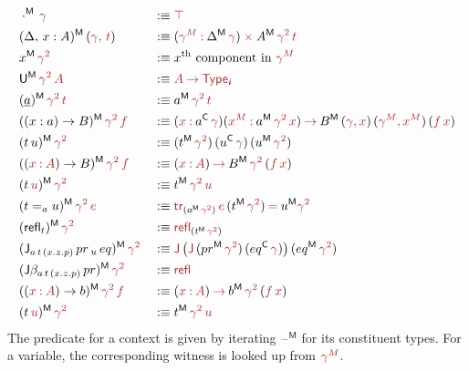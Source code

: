 \documentclass[a4paper,UKenglish]{lipics-v2018}
\newcommand{\U}{\mathsf{U}}
\newcommand{\ra}{\rightarrow}
\newcommand{\blank}{\mathord{\hspace{1pt}\text{--}\hspace{1pt}}} %
\newcommand{\C}{\mathsf{C}}
\newcommand{\M}{\mathsf{M}}
\newcommand{\refl}{\mathsf{refl}}
\newcommand{\1}{\mathsf{1}} \renewcommand{\Pr}{\mathsf{Pr}}
\renewcommand{\in}{\mathbin{\hat:}}
\renewcommand{\hat}[1]{{\color{BrickRed}{#1}}}
\newcommand{\rah}{\mathbin{\hat\ra}}
\newcommand{\commah}{\hat,\,}
\newcommand{\timesh}{\mathbin{\hat\times}}
\newcommand{\eqh}{\mathbin{\hat=}}
\newcommand{\TR}{\hat{\mathsf{tr}}}
\newcommand{\Type}{\hat{\mathsf{Type}}}
\begin{document}
\begin{alignat*}{5}
  & \cdot^\M\,\hat{\gamma} && :\equiv \hat{\top} \\
  & (\Delta,\,x:A)^\M\,(\hat{\gamma}\commah\,\hat{t}) && :\equiv (\hat{\gamma^M}\in\Delta^\M\,\hat{\gamma})\timesh A^\M\,\hat{\gamma^2}\,\hat{t} \\
  & x^\M\,\hat{\gamma^2} && :\equiv x^{\text{th}}\text{ component in } \hat{\gamma^M} \\ %
  & \U^\M\,\hat{\gamma^2}\,\hat{A} && :\equiv \hat{A} \rah  \Type_{i} \\
  & (\underline{a})^\M\,\hat{\gamma^2}\,\hat{t} && :\equiv a^\M\,\hat{\gamma^2}\,\hat{t} \\
  & ((x:a)\ra B)^\M\,\hat{\gamma^2}\,\hat{f} && :\equiv (\hat{x}\in a^\C\,\hat{\gamma})(\hat{x^M}\in a^\M\,\hat{\gamma^2}\,\hat{x}) \rah  B^\M\,(\hat{\gamma}\commah\hat{x})\,(\hat{\gamma^M}\commah\hat{x^M})\,(\hat{f}\,\hat{x}) \\
  & (t\,u)^\M\,\hat{\gamma^2} && :\equiv (t^\M\,\hat{\gamma^2})\,( u^\C\,\hat{\gamma})\,(u^\M\,\hat{\gamma^2}) \\
  & ((\hat{x}\in \hat{A})\ra B)^\M\,\hat{\gamma^2}\,\hat{f} && :\equiv (\hat{x}\in \hat{A})\rah  B^\M\,\hat{\gamma^2}\,(\hat{f}\,\hat{x}) \\
  & (t\,\hat{u})^\M\,\hat{\gamma^2} && :\equiv t^\M\,\hat{\gamma^2}\,\hat{u} \\
  & (t=_a u)^\M\,\hat{\gamma^2}\,\hat{e} && :\equiv \TR_{(a^\M\,\hat{\gamma^2})}\,\hat{e}\,(t^\M\,\hat{\gamma^2}) \eqh u^\M\hat{\gamma^2} \\
  & (\refl_t)^\M\,\hat{\gamma^2} && :\equiv \hat{\refl}_{(t^\M\,\hat{\gamma^2})} \\
  & (\J_{a\,t\,(x.z.p)}\,pr\,_u\,eq)^\M\,\hat{\gamma^2} && :\equiv \hat{\J}\,\big(\hat{\J}\,(pr^\M\,\hat{\gamma^2})\,(eq^\C\,\hat{\gamma})\big)\,(eq^\M\,\hat{\gamma^2}) \\
  & (\J\beta_{a\,t\,(x.z.p)}\,pr)^\M\,\hat{\gamma^2} && :\equiv \hat{\refl} \\
  & ((\hat{x}\in \hat{A})\ra b)^\M\,\hat{\gamma^2}\,\hat{f} && :\equiv (\hat{x}\in \hat{A})\rah  b^\M\,\hat{\gamma^2}\,(\hat{f}\,\hat{x}) \\
  & (t\,\hat{u})^\M\,\hat{\gamma^2} && :\equiv t^\M\,\hat{\gamma^2}\,\hat{u}
\end{alignat*}\endgroup
The predicate for a context is given by iterating $\blank^\M$ for its
constituent types. For a variable, the corresponding witness is looked
up from $\hat{\gamma^M}$.
\end{document}
